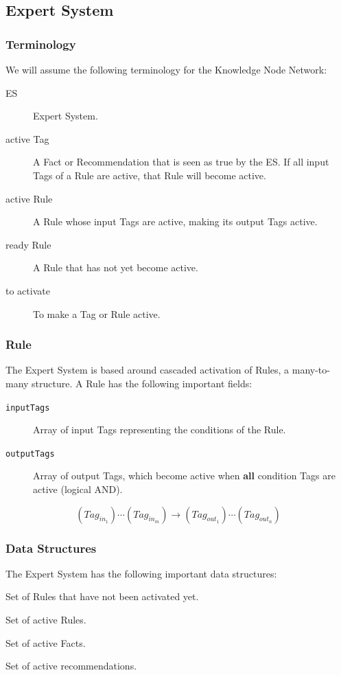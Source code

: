 \documentclass{beamer}
\newcommand{\code}[1]{\texttt{#1}}
\begin{document}
	\subsection{Expert System}
	
	\begin{frame}
		\frametitle{Terminology}
		We will assume the following terminology for the Knowledge Node Network:
		\begin{description}
			\item[ES] Expert System.
			\item[active Tag] A Fact or Recommendation that is seen as true by the ES. If all input Tags of a Rule are active, that Rule will become active.
			\item[active Rule] A Rule whose input Tags are active, making its output Tags active.
			\item[ready Rule] A Rule that has not yet become active.
			\item[to activate] To make a Tag or Rule active.
		\end{description}
	\end{frame}
	
	\begin{frame}
		\frametitle{Rule}
		The Expert System is based around cascaded activation of Rules, a many-to-many structure. A Rule has the following important fields:
		\begin{description}
			\item[\code{inputTags}] Array of input Tags representing the conditions of the Rule.
			\item[\code{outputTags}] Array of output Tags, which become active when \textbf{all} condition Tags are active (logical AND).
		\end{description}
	
		\begin{equation}
			(Tag_{in_1}) \cdots (Tag_{in_m}) \rightarrow (Tag_{out_1}) \cdots (Tag_{out_n})
		\end{equation}
	\end{frame}

	\begin{frame}
		\frametitle{Data Structures}
		The Expert System has the following important data structures:
		\begin{description}[\code{recommendations}]
			\item[\code{readyRules}] Set of Rules that have not been activated yet.
			\item[\code{activeRules}] Set of active Rules.
			\item[\code{facts}] Set of active Facts.
			\item[\code{recommendations}] Set of active recommendations.
		\end{description}
	\end{frame}
\end{document}
